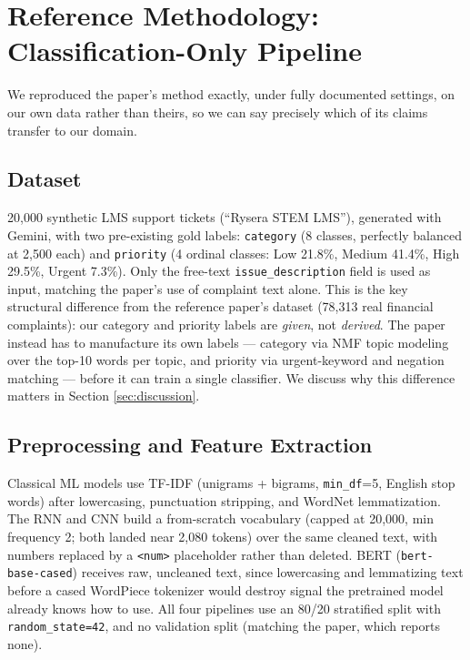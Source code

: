 \documentclass[conference]{IEEEtran}
\begin{document}
\section{Reference Methodology: Classification-Only Pipeline}
\label{sec:methodology-paper}

We reproduced the paper's method exactly, under fully documented settings, on our own data rather than theirs, so we can say precisely which of its claims transfer to our domain.

\subsection{Dataset}
20,000 synthetic LMS support tickets (``Rysera STEM LMS''), generated with Gemini, with two pre-existing gold labels: \texttt{category} (8 classes, perfectly balanced at 2{,}500 each) and \texttt{priority} (4 ordinal classes: Low 21.8\%, Medium 41.4\%, High 29.5\%, Urgent 7.3\%). Only the free-text \texttt{issue\_description} field is used as input, matching the paper's use of complaint text alone. This is the key structural difference from the reference paper's dataset (78,313 real financial complaints): our category and priority labels are \emph{given}, not \emph{derived}. The paper instead has to manufacture its own labels --- category via NMF topic modeling over the top-10 words per topic, and priority via urgent-keyword and negation matching --- before it can train a single classifier. We discuss why this difference matters in Section \ref{sec:discussion}.

\subsection{Preprocessing and Feature Extraction}
Classical ML models use TF-IDF (unigrams + bigrams, \texttt{min\_df}=5, English stop words) after lowercasing, punctuation stripping, and WordNet lemmatization. The RNN and CNN build a from-scratch vocabulary (capped at 20,000, min frequency 2; both landed near 2,080 tokens) over the same cleaned text, with numbers replaced by a \texttt{<num>} placeholder rather than deleted. BERT (\texttt{bert-base-cased}) receives raw, uncleaned text, since lowercasing and lemmatizing text before a cased WordPiece tokenizer would destroy signal the pretrained model already knows how to use. All four pipelines use an 80/20 stratified split with \texttt{random\_state=42}, and no validation split (matching the paper, which reports none).
\end{document}
